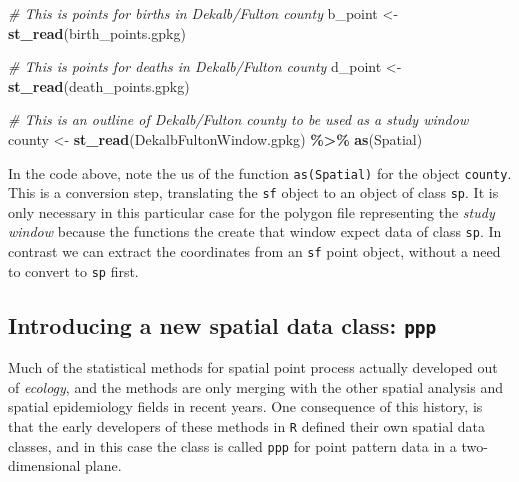 \documentclass[
]{book}
\newenvironment{Shaded}{\begin{snugshade}}{\end{snugshade}}
\newcommand{\CommentTok}[1]{\textcolor[rgb]{0.56,0.35,0.01}{\textit{#1}}}
\newcommand{\FunctionTok}[1]{\textcolor[rgb]{0.13,0.29,0.53}{\textbf{#1}}}
\newcommand{\NormalTok}[1]{#1}
\newcommand{\OtherTok}[1]{\textcolor[rgb]{0.56,0.35,0.01}{#1}}
\newcommand{\SpecialCharTok}[1]{\textcolor[rgb]{0.81,0.36,0.00}{\textbf{#1}}}
\newcommand{\StringTok}[1]{\textcolor[rgb]{0.31,0.60,0.02}{#1}}
\begin{document}
\begin{Shaded}
\begin{Highlighting}[]
\CommentTok{\# This is points for births in Dekalb/Fulton county}
\NormalTok{b\_point }\OtherTok{\textless{}{-}} \FunctionTok{st\_read}\NormalTok{(}\StringTok{\textquotesingle{}birth\_points.gpkg\textquotesingle{}}\NormalTok{)}

\CommentTok{\# This is points for deaths in Dekalb/Fulton county}
\NormalTok{d\_point }\OtherTok{\textless{}{-}} \FunctionTok{st\_read}\NormalTok{(}\StringTok{\textquotesingle{}death\_points.gpkg\textquotesingle{}}\NormalTok{) }

\CommentTok{\# This is an outline of Dekalb/Fulton county to be used as a study \textquotesingle{}window\textquotesingle{}}
\NormalTok{county }\OtherTok{\textless{}{-}} \FunctionTok{st\_read}\NormalTok{(}\StringTok{\textquotesingle{}DekalbFultonWindow.gpkg\textquotesingle{}}\NormalTok{) }\SpecialCharTok{\%\textgreater{}\%}
  \FunctionTok{as}\NormalTok{(}\StringTok{\textquotesingle{}Spatial\textquotesingle{}}\NormalTok{)}
\end{Highlighting}
\end{Shaded}

In the code above, note the us of the function \texttt{as(\textquotesingle{}Spatial\textquotesingle{})} for the object \texttt{county}. This is a conversion step, translating the \texttt{sf} object to an object of class \texttt{sp}. It is only necessary in this particular case for the polygon file representing the \emph{study window} because the functions the create that window expect data of class \texttt{sp}. In contrast we can extract the coordinates from an \texttt{sf} point object, without a need to convert to \texttt{sp} first.

\hypertarget{introducing-a-new-spatial-data-class-ppp}{%
\subsection{\texorpdfstring{Introducing a new spatial data class: \texttt{ppp}}{Introducing a new spatial data class: ppp}}\label{introducing-a-new-spatial-data-class-ppp}}

Much of the statistical methods for spatial point process actually developed out of \emph{ecology}, and the methods are only merging with the other spatial analysis and spatial epidemiology fields in recent years. One consequence of this history, is that the early developers of these methods in \texttt{R} defined their own spatial data classes, and in this case the class is called \texttt{ppp} for point pattern data in a two-dimensional plane.
\end{document}
